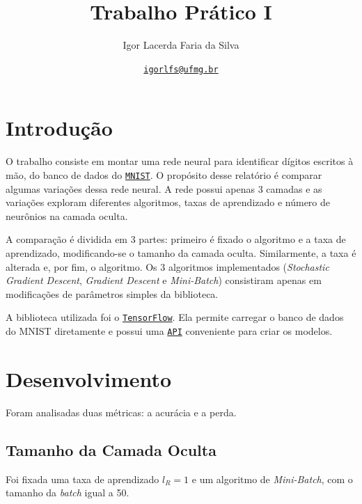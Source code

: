 \documentclass[a4paper]{article}
\title{Trabalho Prático I}
\author{Igor Lacerda Faria da Silva}
\date{\href{mailto:igorlfs@ufmg.br}{\texttt{igorlfs@ufmg.br}} }
\begin{document}
\pagestyle{fancy}

\maketitle

\section{Introdução}
\label{sec:Introdução}

O trabalho consiste em montar uma rede neural para identificar dígitos escritos à mão, do banco de dados do \href{https://en.wikipedia.org/wiki/MNIST_database}{\texttt{MNIST}}. O propósito desse relatório é comparar algumas variações dessa rede neural. A rede possui apenas 3 camadas e as variações exploram diferentes algoritmos, taxas de aprendizado e número de neurônios na camada oculta.

A comparação é dividida em 3 partes: primeiro é fixado o algoritmo e a taxa de aprendizado, modificando-se o tamanho da camada oculta. Similarmente, a taxa é alterada e, por fim, o algoritmo. Os 3 algoritmos implementados (\textit{Stochastic Gradient Descent}, \textit{Gradient Descent} e \textit{Mini-Batch}) consistiram apenas em modificações de parâmetros simples da biblioteca.

A biblioteca utilizada foi o \href{https://www.tensorflow.org/}{\texttt{TensorFlow}}. Ela permite carregar o banco de dados do MNIST diretamente e possui uma \href{https://keras.io/api/}{\texttt{API}} conveniente para criar os modelos.

\section{Desenvolvimento}%
\label{sec:Desenvolvimento}

Foram analisadas duas métricas: a acurácia e a perda.

\subsection{Tamanho da Camada Oculta}%
\label{sub:Tamanho da Camada Oculta}

Foi fixada uma taxa de aprendizado $l_R = 1$ e um algoritmo de \textit{Mini-Batch}, com o tamanho da \textit{batch} igual a 50.
\end{document}
